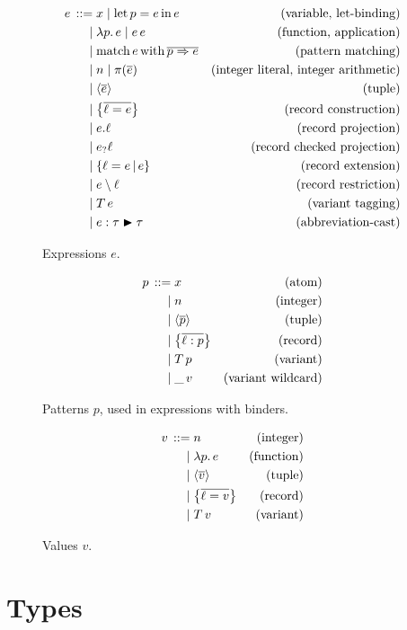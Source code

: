 \begin{figure}[p]
    \centering
\begin{align*}
\graintro e 
x \mid \fllet{p}{e} e
& \text{(variable, let-binding)}
\graitem
\fllam p e \mid e\,e
& \text{(function, application)}
\graitem
\fbmatch e \overline{p \Rightarrow e}
& \text{(pattern matching)}
\graitem
n \mid \pi \left(\overline e \right)
& \text{(integer literal, integer arithmetic)}
\graitem
\fbtuple{\overline e}
& \text{(tuple)}
\graitem
\flrec{\overline{\ell = e}}
& \text{(record construction)}
\graitem
e{.}\ell
& \text{(record projection)}
\graitem
\fbcheck{e}{\ell}
& \text{(record checked projection)}
\graitem
\flext{\ell = e}{e} 
& \text{(record extension)}
\graitem
e \fbrestricted \ell
& \text{(record restriction)}
\graitem
T\,e
& \text{(variant tagging)}
\graitem
\fbcast{e}{\tau}{\tau}
& \text{(abbreviation-cast)}
\end{align*}
    \caption{Expressions $e$.}
    \label{fig:fabric-expressions}
\end{figure}

\begin{figure}[p]
    \centering
\begin{align*}
\graintro p 
x 
& \text{(atom)}
\graitem 
n
& \text{(integer)}
\graitem
\fbtuple{\overline p}
& \text{(tuple)}
\graitem
\flrec{\overline{\ell : p}}
& \text{(record)}
\graitem
T\,p
& \text{(variant)}
\graitem
\_\,v
& \text{(variant wildcard)}
\end{align*}
    \caption{Patterns $p$, used in expressions with binders.}
    \label{fig:fabric-patterns}
\end{figure}

\begin{figure}[p]
    \centering
\begin{align*}
\graintro v 
n 
& \text{(integer)}
\graitem
\fllam p e
& \text{(function)}
\graitem
\fbtuple{\overline v}
& \text{(tuple)}
\graitem
\flrec{\overline{\ell = v}} 
& \text{(record)}
\graitem
T\,v
& \text{(variant)}
\end{align*}
    \caption{Values $v$.}
    \label{fig:fabric-values}
\end{figure}

\section{Types}

\newcommand{\fbvar}[2]{\left[ #1 \mid #2 \right]}

